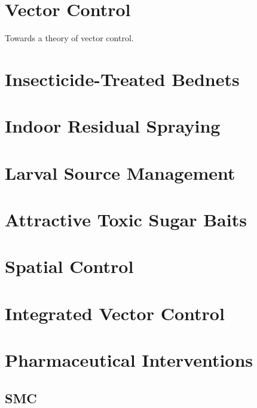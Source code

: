\documentclass[
]{book}
\begin{document}
\hypertarget{vector-control}{%
\chapter{Vector Control}\label{vector-control}}

Towards a theory of vector control.

\hypertarget{insecticide-treated-bednets}{%
\chapter{Insecticide-Treated Bednets}\label{insecticide-treated-bednets}}

\hypertarget{indoor-residual-spraying}{%
\chapter{Indoor Residual Spraying}\label{indoor-residual-spraying}}

\hypertarget{larval-source-management}{%
\chapter{Larval Source Management}\label{larval-source-management}}

\hypertarget{attractive-toxic-sugar-baits}{%
\chapter{Attractive Toxic Sugar Baits}\label{attractive-toxic-sugar-baits}}

\hypertarget{spatial-control}{%
\chapter{Spatial Control}\label{spatial-control}}

\hypertarget{integrated-vector-control}{%
\chapter{Integrated Vector Control}\label{integrated-vector-control}}

\hypertarget{pharmaceutical-interventions-1}{%
\chapter{Pharmaceutical Interventions}\label{pharmaceutical-interventions-1}}

\hypertarget{smc-1}{%
\section{SMC}\label{smc-1}}
\end{document}
